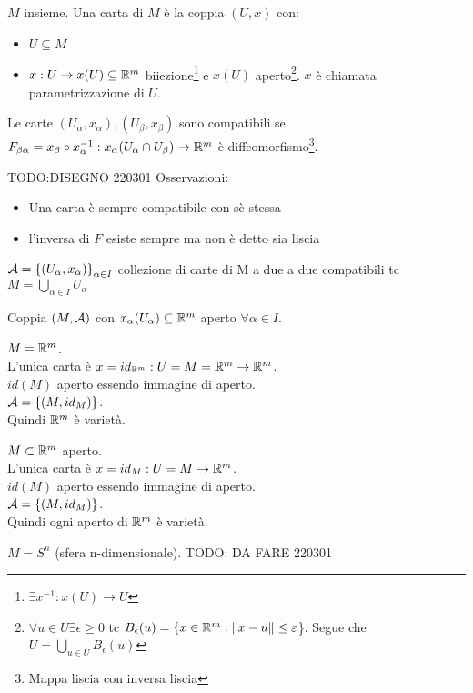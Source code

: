 \begin{definition}[Carta]
    $M$ insieme. Una carta di $M$ è la coppia $(U,x)$ con:
    \begin{itemize}
        \item $U\subseteq M$ 
        \item $x: U \rightarrow x(U)\subseteq \mathbb{R}^m$
        biiezione\footnote{$\exists x^{-1}: x(U)\rightarrow U$}
        e $x(U)$ aperto\footnote{$\forall u\in U\exists
        \epsilon\geq 0$ tc $B_{\epsilon}(u)=\{x\in \mathbb{R}^m:
        \norm{x-u}\leq\varepsilon$\}. Segue che $U=\bigcup_{u\in
        U} B_{\epsilon}(u)$}. $x$ è chiamata parametrizzazione di
        $U$.
    \end{itemize}
\end{definition}
\begin{definition}
    Le carte $(U_{\alpha},x_{\alpha}),(U_{\beta},x_{\beta})$ sono
    compatibili se $F_{\beta\alpha}=x_{\beta}\circ
    x^{-1}_{\alpha}:x_{\alpha}(U_{\alpha}\cap U_{\beta})\rightarrow
    \mathbb{R}^m$ è diffeomorfismo\footnote{Mappa liscia con inversa
    liscia}.
\end{definition}
TODO:DISEGNO 220301
Osservazioni: 
\begin{itemize}
    \item Una carta è sempre compatibile con sè stessa 
    \item l'inversa di $F$ esiste sempre ma non è detto sia liscia
\end{itemize}
\begin{definition}[Atlante]
    $\mathcal{A}=\left\{ (U_{\alpha},x_{\alpha}) \right\}_{\alpha\in I}$
    collezione di carte di M a due a due compatibili tc
    $M=\bigcup_{\alpha\in I}U_{\alpha}$
\end{definition}
\begin{definition}
    Coppia $(M,\mathcal{A})$ con $x_{\alpha}(U_{\alpha})\subseteq \mathbb{R}^m$
    aperto $\forall\alpha\in I$.
\end{definition}

\begin{ex}
    $M=\mathbb{R}^m$.\\
    L'unica carta è $x=id_{\mathbb{R}^m}:U=M=\mathbb{R}^m\rightarrow\mathbb{R}^m$.\\ 
    $id(M)$ aperto essendo immagine di aperto.\\
    $\mathcal{A}=\left\{ (M,id_M) \right\}$.\\
    Quindi $\mathbb{R}^m$ è varietà.
\end{ex}
\begin{ex}
    $M\subset\mathbb{R}^m$ aperto.\\
    L'unica carta è $x=id_{M}:U=M\rightarrow\mathbb{R}^m$.\\ 
    $id(M)$ aperto essendo immagine di aperto.\\
    $\mathcal{A}=\left\{ (M,id_M) \right\}$.\\
    Quindi ogni aperto di $\mathbb{R}^m$ è varietà.
\end{ex}
\begin{ex}
    $M=S^n$ (sfera n-dimensionale).
    TODO: DA FARE 220301
\end{ex}




